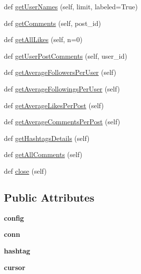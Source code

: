 \begin{DoxyCompactItemize}
\item 
def \mbox{\hyperlink{classsql__client_1_1_sql_client_a4ec5854106ec0e7cfeccfdd3e51a1653}{get\+User\+Names}} (self, limit, labeled=True)
\item 
def \mbox{\hyperlink{classsql__client_1_1_sql_client_a3d816cc763f7bfc338661b48f045ef45}{get\+Comments}} (self, post\+\_\+id)
\item 
def \mbox{\hyperlink{classsql__client_1_1_sql_client_af4d17e7a095ea153202ad62ab4400a1a}{get\+All\+Likes}} (self, n=0)
\item 
def \mbox{\hyperlink{classsql__client_1_1_sql_client_aa74c78382113ffc2204b6361e9c1d1f4}{get\+User\+Post\+Comments}} (self, user\+\_\+id)
\item 
def \mbox{\hyperlink{classsql__client_1_1_sql_client_a6f0328bf169e37403176157b9899603e}{get\+Average\+Followers\+Per\+User}} (self)
\item 
def \mbox{\hyperlink{classsql__client_1_1_sql_client_a7db4bd36f417ef6e04c27bb3c225ced7}{get\+Average\+Followings\+Per\+User}} (self)
\item 
def \mbox{\hyperlink{classsql__client_1_1_sql_client_aba9982883d49d334c0f6f2d9c7ce4965}{get\+Average\+Likes\+Per\+Post}} (self)
\item 
def \mbox{\hyperlink{classsql__client_1_1_sql_client_a21df01dcb35afd430c1e03623d393227}{get\+Average\+Comments\+Per\+Post}} (self)
\item 
def \mbox{\hyperlink{classsql__client_1_1_sql_client_a17678dbe8928fffbcb625bbdf33786c6}{get\+Hashtags\+Details}} (self)
\item 
def \mbox{\hyperlink{classsql__client_1_1_sql_client_ada4e31012fee403ce53f35564505fcc1}{get\+All\+Comments}} (self)
\item 
def \mbox{\hyperlink{classsql__client_1_1_sql_client_ab74d313a5b3e9a155fd0ad64bd22a1df}{close}} (self)
\end{DoxyCompactItemize}
\subsection*{Public Attributes}
\begin{DoxyCompactItemize}
\item 
\mbox{\label{classsql__client_1_1_sql_client_a23b9856c2aa3bbb39027108647fa9736}} 
{\bfseries config}
\item 
\mbox{\label{classsql__client_1_1_sql_client_af82ec6f9b2b4383b2e7ef66731bdf03f}} 
{\bfseries conn}
\item 
\mbox{\label{classsql__client_1_1_sql_client_a8210f698640c872cc175d62069f6e16e}} 
{\bfseries hashtag}
\item 
\mbox{\label{classsql__client_1_1_sql_client_af9b4bd722cc007fd2f4de961da81c959}} 
{\bfseries cursor}
\end{DoxyCompactItemize}


